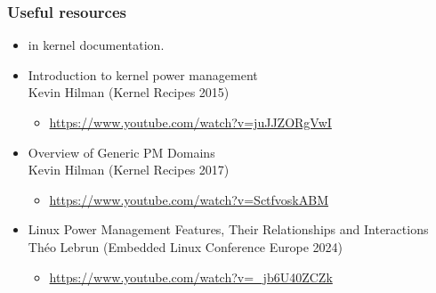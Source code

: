 \begin{frame}
  \frametitle{Useful resources}
  \begin{itemize}
  \item {} in kernel documentation.
  \item Introduction to kernel power management \\
    Kevin Hilman (Kernel Recipes 2015)
    \begin{itemize}
    \item \url{https://www.youtube.com/watch?v=juJJZORgVwI}
    \end{itemize}
  \item Overview of Generic PM Domains \\
    Kevin Hilman (Kernel Recipes 2017)
    \begin{itemize}
    \item \url{https://www.youtube.com/watch?v=SctfvoskABM}
    \end{itemize}
  \item Linux Power Management Features, Their Relationships and
    Interactions \\
    Théo Lebrun (Embedded Linux Conference Europe 2024)
    \begin{itemize}
    \item \url{https://www.youtube.com/watch?v=_jb6U40ZCZk}
    \end{itemize}
  \end{itemize}
\end{frame}
